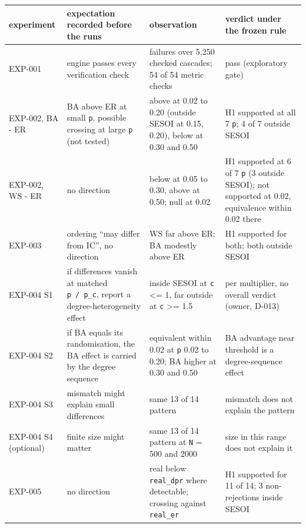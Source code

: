 \documentclass[
]{article}
\begin{document}
\begin{longtable}[]{@{}
  >{\raggedright\arraybackslash}p{}
  >{\raggedright\arraybackslash}p{}
  >{\raggedright\arraybackslash}p{}
  >{\raggedright\arraybackslash}p{}@{}}
\toprule\noalign{}
\begin{minipage}[b]{\linewidth}\raggedright
experiment
\end{minipage} & \begin{minipage}[b]{\linewidth}\raggedright
expectation recorded before the runs
\end{minipage} & \begin{minipage}[b]{\linewidth}\raggedright
observation
\end{minipage} & \begin{minipage}[b]{\linewidth}\raggedright
verdict under the frozen rule
\end{minipage} \\
\midrule\noalign{}
\endhead
\bottomrule\noalign{}
\endlastfoot
EXP-001 & engine passes every verification check & 0 failures over 5,250
checked cascades; 54 of 54 metric checks & pass (exploratory gate) \\
EXP-002, BA - ER & BA above ER at small \texttt{p}, possible crossing at
large \texttt{p} (not tested) & above at 0.02 to 0.20 (outside SESOI at
0.15, 0.20), below at 0.30 and 0.50 & H1 supported at all 7 \texttt{p};
4 of 7 outside SESOI \\
EXP-002, WS - ER & no direction & below at 0.05 to 0.30, above at 0.50;
null at 0.02 & H1 supported at 6 of 7 \texttt{p} (3 outside SESOI); not
supported at 0.02, equivalence within 0.02 there \\
EXP-003 & ordering ``may differ from IC'', no direction & WS far above
ER; BA modestly above ER & H1 supported for both; both outside SESOI \\
EXP-004 S1 & if differences vanish at matched \texttt{p\ /\ p\_c},
report a degree-heterogeneity effect & inside SESOI at \texttt{c}
\textless= 1, far outside at \texttt{c} \textgreater= 1.5 & per
multiplier, no overall verdict (owner, D-013) \\
EXP-004 S2 & if BA equals its randomisation, the BA effect is carried by
the degree sequence & equivalent within 0.02 at \texttt{p} 0.02 to 0.20;
BA higher at 0.30 and 0.50 & BA advantage near threshold is a
degree-sequence effect \\
EXP-004 S3 & mismatch might explain small differences & same 13 of 14
pattern & mismatch does not explain the pattern \\
EXP-004 S4 (optional) & finite size might matter & same 13 of 14 pattern
at \texttt{N} = 500 and 2000 & size in this range does not explain it \\
EXP-005 & no direction & real below \texttt{real\_dpr} where detectable;
crossing against \texttt{real\_er} & H1 supported for 11 of 14; 3
non-rejections inside SESOI \\
\end{longtable}
\end{document}
